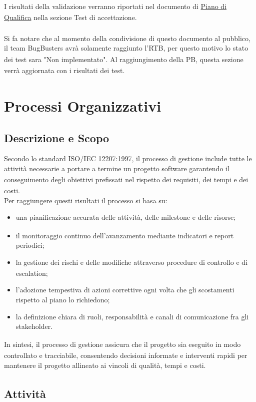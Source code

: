 \documentclass[a4paper,11pt]{article}
\newcommand{\G}{\textsubscript{\scalebox{0.6}{\textbf{G}}}}
\begin{document}
I risultati della validazione\G{} verranno riportati nel documento di \href{https://bugbustersunipd.github.io/DocumentazioneSWE/PB/PIANO%20DI%20QUALIFICA/Piano%20di%20Qualifica.pdf}{Piano di Qualifica\G{}} nella sezione Test\G{} di accettazione.\\\\
Si fa notare che al momento della condivisione di questo documento al pubblico, il team BugBusters avrà solamente raggiunto l'RTB\G{}, per questo motivo lo stato dei test\G{} sara "Non implementato". Al raggiungimento della PB\G{}, questa sezione verrà aggiornata con i risultati dei test\G{}.

\section{Processi Organizzativi}

\subsection{Descrizione e Scopo}
Secondo lo standard ISO/IEC 12207:1997, il processo di gestione include tutte le 
attività necessarie a portare a termine un progetto\G{} software garantendo il 
conseguimento degli obiettivi prefissati nel rispetto dei requisiti\G{}, dei tempi e
 dei costi. \\
Per raggiungere questi risultati il processo si basa su:
\begin{itemize}
    \item una pianificazione accurata delle attività, delle milestone\G{} e delle risorse;
    \item il monitoraggio continuo dell'avanzamento mediante indicatori e report periodici;
    \item la gestione dei rischi\G{} e delle modifiche attraverso procedure di controllo e di escalation;
    \item l'adozione tempestiva di azioni correttive ogni volta che gli scostamenti rispetto al piano lo richiedono;
    \item la definizione chiara di ruoli, responsabilità e canali di comunicazione fra gli stakeholder\G{}.
\end{itemize}
In sintesi, il processo di gestione assicura che il progetto\G{} sia 
eseguito in modo controllato e tracciabile, consentendo decisioni informate 
e interventi rapidi per mantenere il progetto\G{} allineato ai vincoli di qualità\G{}, 
tempi e costi.

\subsection{Attività}
\end{document}
